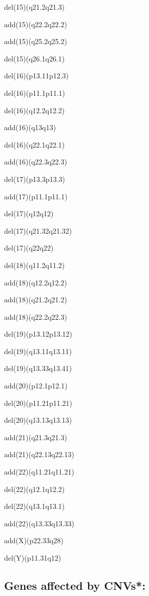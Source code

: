 \documentclass[]{article}
\begin{document}
del(15)(q21.2q21.3)

add(15)(q22.2q22.2)

add(15)(q25.2q25.2)

del(15)(q26.1q26.1)

del(16)(p13.11p12.3)

del(16)(p11.1p11.1)

del(16)(q12.2q12.2)

add(16)(q13q13)

del(16)(q22.1q22.1)

add(16)(q22.3q22.3)

del(17)(p13.3p13.3)

add(17)(p11.1p11.1)

del(17)(q12q12)

del(17)(q21.32q21.32)

del(17)(q22q22)

del(18)(q11.2q11.2)

add(18)(q12.2q12.2)

add(18)(q21.2q21.2)

add(18)(q22.2q22.3)

del(19)(p13.12p13.12)

del(19)(q13.11q13.11)

del(19)(q13.33q13.41)

add(20)(p12.1p12.1)

del(20)(p11.21p11.21)

del(20)(q13.13q13.13)

add(21)(q21.3q21.3)

add(21)(q22.13q22.13)

add(22)(q11.21q11.21)

del(22)(q12.1q12.2)

del(22)(q13.1q13.1)

add(22)(q13.33q13.33)

add(X)(p22.33q28)

del(Y)(p11.31q12)

\hypertarget{genes-affected-by-cnvs}{%
\subsection{Genes affected by CNVs*:}\label{genes-affected-by-cnvs}}
\end{document}
